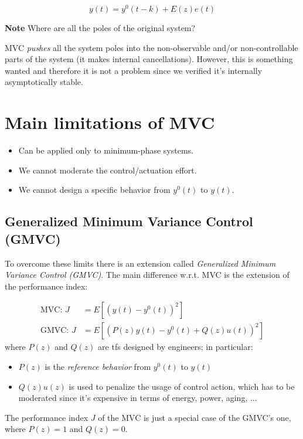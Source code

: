 \begin{rem}
    \[
    	y(t) = y^0(t-k) + E(z) e(t)
    \]

    \textbf{Note} Where are all the poles of the original system?

    MVC \emph{pushes} all the system poles into the non-observable and/or non-controllable parts of the system (it makes internal cancellations). However,
    this is something wanted and therefore it is not a problem since we verified it's internally asymptotically stable.
\end{rem}

\section{Main limitations of MVC}

\begin{itemize}
    \item Can be applied only to minimum-phase systems.
    \item We cannot moderate the control/actuation effort.
    \item We cannot design a specific behavior from $y^0(t)$ to $y(t)$.
\end{itemize}


\subsection{Generalized Minimum Variance Control (GMVC)}\label{subsec:GMVC}

To overcome these limits there is an extension called \emph{Generalized Minimum Variance Control (GMVC)}.
The main difference w.r.t. MVC is the extension of the performance index:

\begin{align*}
    \text{MVC: } J &= E\left[ \left(y(t) - y^0(t)\right)^2 \right] \\
    \text{GMVC: } J &= E\left[ \left(P(z)y(t) - y^0(t) + Q(z)u(t)\right)^2 \right]
\end{align*}
where $P(z)$ and $Q(z)$ are \gls{tf}s designed by engineers; in particular:
\begin{itemize}
    \item $P(z)$ is the \emph{reference behavior} from $y^0(t)$ to $y(t)$
    \item $Q(z) u(z)$ is used to penalize the usage of control action, which has to be moderated since it's expensive in terms of energy, power, aging, ...
\end{itemize}

\begin{rem}
	The performance index $J$ of the MVC is just a special case of the GMVC's one, where $P(z) = 1$ and $Q(z) = 0$.
\end{rem}

